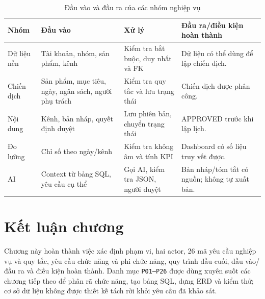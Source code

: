 \begin{table}[h!]
\centering
\small
\caption{Đầu vào và đầu ra của các nhóm nghiệp vụ}
\begin{tabularx}{\textwidth}{|L{3.0cm}|Y|Y|Y|}
\hline
\textbf{Nhóm} & \textbf{Đầu vào} & \textbf{Xử lý} & \textbf{Đầu ra/điều kiện hoàn thành}\\\hline
Dữ liệu nền & Tài khoản, nhóm, sản phẩm, kênh & Kiểm tra bắt buộc, duy nhất và FK & Dữ liệu có thể dùng để lập chiến dịch.\\\hline
Chiến dịch & Sản phẩm, mục tiêu, ngày, ngân sách, người phụ trách & Kiểm tra quy tắc và lưu trạng thái & Chiến dịch được phân công.\\\hline
Nội dung & Kênh, bản nháp, quyết định duyệt & Lưu phiên bản, chuyển trạng thái & APPROVED trước khi lập lịch.\\\hline
Đo lường & Chỉ số theo ngày/kênh & Kiểm tra không âm và tính KPI & Dashboard có số liệu truy vết được.\\\hline
AI & Context từ bảng SQL, yêu cầu cụ thể & Gọi AI, kiểm tra JSON, người duyệt & Bản nháp/tóm tắt có nguồn; không tự xuất bản.\\\hline
\end{tabularx}
\end{table}

\enlargethispage{4\baselineskip}
\section{Kết luận chương}

Chương này hoàn thành việc xác định phạm vi, hai actor, 26 mã yêu cầu nghiệp vụ và quy tắc, yêu cầu chức năng và phi chức năng, quy trình đầu-cuối, đầu vào/đầu ra và điều kiện hoàn thành. Danh mục \texttt{P01--P26} được dùng xuyên suốt các chương tiếp theo để phân rã chức năng, tạo bảng SQL, dựng ERD và kiểm thử; cơ sở dữ liệu không được thiết kế tách rời khỏi yêu cầu đã khảo sát.
